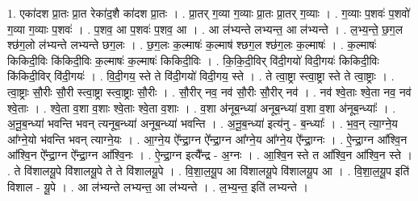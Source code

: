 \documentclass[17pt]{extarticle}
\begin{document}
1. एका॑दश प्रा॒तः प्रा॒त रेका॑द॒शै का॑दश प्रा॒तः । . प्रा॒तर् ग॒व्या ग॒व्याः प्रा॒तः प्रा॒तर् ग॒व्याः । . ग॒व्याः प॒शवः॑ प॒शवो॑ ग॒व्या ग॒व्याः प॒शवः॑ । . प॒शव॒ आ प॒शवः॑ प॒शव॒ आ । . आ ल॑भ्यन्ते लभ्यन्त॒ आ ल॑भ्यन्ते । . ल॒भ्य॒न्ते॒ छ॒ग॒ल श्छ॑ग॒लो ल॑भ्यन्ते लभ्यन्ते छग॒लः । . छ॒ग॒लः क॒ल्माषः॑ क॒ल्माष॑ श्छग॒ल श्छ॑ग॒लः क॒ल्माषः॑ । . क॒ल्माषः॑ किकिदी॒विः कि॑किदी॒विः क॒ल्माषः॑ क॒ल्माषः॑ किकिदी॒विः । . कि॒कि॒दी॒विर् वि॑दी॒गयो॑ विदी॒गयः॑ किकिदी॒विः कि॑किदी॒विर् वि॑दी॒गयः॑ । . वि॒दी॒गय॒ स्ते ते वि॑दी॒गयो॑ विदी॒गय॒ स्ते । . ते त्वा॒ष्ट्रा स्त्वा॒ष्ट्रा स्ते ते त्वा॒ष्ट्राः । . त्वा॒ष्ट्राः सौ॒रीः सौ॒री स्त्वा॒ष्ट्रा स्त्वा॒ष्ट्राः सौ॒रीः । . सौ॒रीर् नव॒ नव॑ सौ॒रीः सौ॒रीर् नव॑ । . नव॑ श्वे॒ताः श्वे॒ता नव॒ नव॑ श्वे॒ताः । . श्वे॒ता व॒शा व॒शाः श्वे॒ताः श्वे॒ता व॒शाः । . व॒शा अ॑नूब॒न्ध्या॑ अनूब॒न्ध्या॑ व॒शा व॒शा अ॑नूब॒न्ध्याः᳚ । . अ॒नू॒ब॒न्ध्या॑ भवन्ति भवन् त्यनूब॒न्ध्या॑ अनूब॒न्ध्या॑ भवन्ति । . अ॒नू॒ब॒न्ध्या॑ इत्य॑नु - ब॒न्ध्याः᳚ । . भ॒व॒न् त्या॒ग्ने॒य आ᳚ग्ने॒यो भ॑वन्ति भवन् त्याग्ने॒यः । . आ॒ग्ने॒य ऐ᳚न्द्रा॒ग्न ऐ᳚न्द्रा॒ग्न आ᳚ग्ने॒य आ᳚ग्ने॒य ऐ᳚न्द्रा॒ग्नः । . ऐ॒न्द्रा॒ग्न आ᳚श्वि॒न आ᳚श्वि॒न ऐ᳚न्द्रा॒ग्न ऐ᳚न्द्रा॒ग्न आ᳚श्वि॒नः । . ऐ॒न्द्रा॒ग्न इत्यै᳚न्द्र - अ॒ग्नः । . आ॒श्वि॒न स्ते त आ᳚श्वि॒न आ᳚श्वि॒न स्ते । . ते वि॑शालयू॒पे वि॑शालयू॒पे ते ते वि॑शालयू॒पे । . वि॒शा॒ल॒यू॒प आ वि॑शालयू॒पे वि॑शालयू॒प आ । . वि॒शा॒ल॒यू॒प इति॑ विशाल - यू॒पे । . आ ल॑भ्यन्ते लभ्यन्त॒ आ ल॑भ्यन्ते । . ल॒भ्य॒न्त॒ इति॑ लभ्यन्ते । \newline
\end{document}
